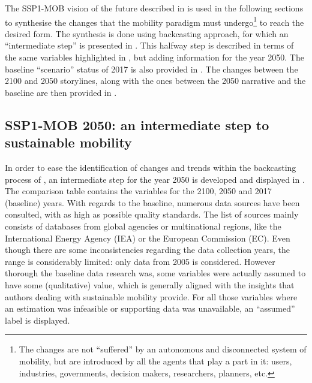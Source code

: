 The SSP1-MOB vision of the future described in  is used in the following sections to synthesise the changes that the mobility paradigm must undergo\footnote{The changes are not ``suffered'' by an autonomous and disconnected system of mobility, but are introduced by all the agents that play a part in it: users, industries, governments, decision makers, researchers, planners, etc.} to reach the desired form. The synthesis is done using backcasting approach, for which an ``intermediate step'' is presented in . This halfway step is described in terms of the same variables highlighted in , but adding information for the year 2050. The baseline ``scenario'' status of 2017 is also provided in . The changes between the 2100 and 2050 storylines, along with the ones between the 2050 narrative and the baseline are then provided in .

\subsection{SSP1-MOB 2050: an intermediate step to sustainable mobility}
\label{ss:results:backcasting-2050-intermediate-step}
In order to ease the identification of changes and trends within the backcasting process of , an intermediate step for the year 2050 is developed and displayed in . The comparison table contains the variables for the 2100, 2050 and 2017 (baseline) years. With regards to the baseline, numerous data sources have been consulted, with as high as possible quality standards. The list of sources mainly consists of databases from global agencies or multinational regions, like the International Energy Agency (IEA) or the European Commission (EC). Even though there are some inconsistencies regarding the data collection years, the range is considerably limited: only data from 2005 is considered. However thorough the baseline data research was, some variables were actually assumed to have some (qualitative) value, which is generally aligned with the insights that authors dealing with sustainable mobility provide. For all those variables where an estimation was infeasible or supporting data was unavailable, an ``assumed'' label is displayed.
%

